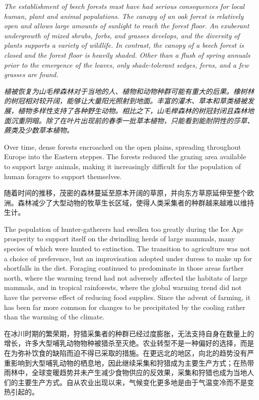 \begin{Parallel}{97mm}{45mm}
  \ParallelLText
  {\footnotesize{\emph{The establishment of beech forests must have had serious consequences for local human, plant and animal populations. The canopy of an oak forest is relatively open and allows large amounts of sunlight to reach the forest floor. An exuberant undergrowth of mixed shrubs, forbs, and grasses develops, and the diversity of plants supports a variety of wildlife. In contrast, the canopy of a beech forest is closed and the forest floor is heavily shaded. Other than a flush of spring annuals prior to the emergence of the leaves, only shade-tolerant sedges, ferns, and a few grasses are found.}}}
  
  \ParallelRText
  {\footnotesize{\emph{植被恢复为山毛榉森林对于当地的人、植物和动物种群可能有重大的后果。橡树林的树冠相对较开阔，能够让大量阳光照射到地面。丰富的灌木、草本和草类植被发展，植物多样性支持了各种野生动物。相比之下，山毛榉森林的树冠封闭且森林地面沉重阴暗。除了在叶片出现前的春季一批草本植物，只能看到能耐阴性的莎草、蕨类及少数草本植物。}}}
  \ParallelPar



  \ParallelLText
  {Over time, dense forests encroached on the open plains, spreading throughout Europe into the Eastern steppes. The forests reduced the grazing area available to support large animals, making it increasingly difficult for the population of human foragers to support themselves.}
  
  \ParallelRText
  {随着时间的推移，茂密的森林蔓延至原本开阔的草原，并向东方草原延伸至整个欧洲。森林减少了大型动物的牧草生长区域，使得人类采集者的种群越来越难以维持生计。}
  \ParallelPar



  \ParallelLText
  {The population of hunter-gatherers had swollen too greatly during the Ice Age prosperity to support itself on the dwindling herds of large mammals, many species of which were hunted to extinction. The transition to agriculture was not a choice of preference, but an improvisation adopted under duress to make up for shortfalls in the diet. Foraging continued to predominate in those areas farther north, where the warming trend had not adversely affected the habitats of large mammals, and in tropical rainforests, where the global warming trend did not have the perverse effect of reducing food supplies. Since the advent of farming, it has been far more common for changes to be precipitated by the cooling rather than the warming of the climate.}
  
  \ParallelRText
  {在冰川时期的繁荣期，狩猎采集者的种群已经过度膨胀，无法支持自身在数量上的增长，许多大型哺乳动物物种被猎杀至灭绝。农业转型不是一种偏好的选择，而是在为弥补饮食的缺陷而迫不得已采取的措施。在更远北的地区，向北的趋势没有严重影响到大型哺乳动物的栖息地，因此继续采集和狩猎成为主要生产方式；在热带雨林中，全球变暖趋势并未产生减少食物供应的反效果，采集和狩猎也成为当地人们的主要生产方式。自从农业出现以来，气候变化更多地是由于气温变冷而不是变热引起的。}
  \ParallelPar



\end{Parallel}
